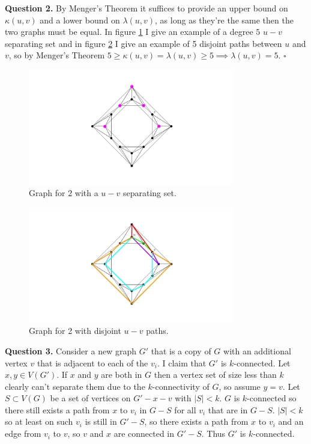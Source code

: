 \documentclass[letterpaper, reqno,11pt]{article}
\begin{document}
{\medskip\noindent\bf Question 2.} By Menger's Theorem it suffices to provide an upper bound on $\kappa(u,v)$ and a lower bound on $\lambda(u,v)$, as long as they're the same then the two graphs must be equal. In figure \ref{fig:2a} I give an example of a degree $5$ $u-v$ separating set and in figure \ref{fig:2b} I give an example of 5 disjoint paths between $u$ and $v$, so by Menger's Theorem $5\geq \kappa(u,v)=\lambda(u,v)\geq 5\implies \lambda(u,v)=5$. $\square$

\begin{figure}[htpb]
    \centering
    \includegraphics[width=0.8\textwidth]{2a}
    \caption{Graph for 2 with a $u-v$ separating set.}
    \label{fig:2a}
\end{figure}

\begin{figure}[htpb]
    \centering
    \includegraphics[width=0.8\textwidth]{2b}
    \caption{Graph for 2 with disjoint $u-v$ paths.}
    \label{fig:2b}
\end{figure}

{\medskip\noindent\bf Question 3.} Consider a new graph $G'$ that is a copy of $G$ with an additional vertex $v$ that is adjacent to each of the $v_i$. I claim that $G'$ is $k$-connected. Let $x,y\in V(G')$. If $x$ and $y$ are both in $G$ then a vertex set of size less than $k$ clearly can't separate them due to the $k$-connectivity of $G$, so assume $y=v$. Let $S\subset V(G)$ be a set of vertices on $G'-x-v$ with $|S|<k$. $G$ is $k$-connected so there still exists a path from $x$ to $v_i$ in $G-S$ for all $v_i$ that are in $G-S$. $|S|<k$ so at least on such $v_i$ is still in $G'-S$, so there exists a path from $x$ to $v_i$ and an edge from $v_i$ to $v$, so $v$ and $x$ are connected in $G'-S$. Thus $G'$ is $k$-connected. 
\end{document}
